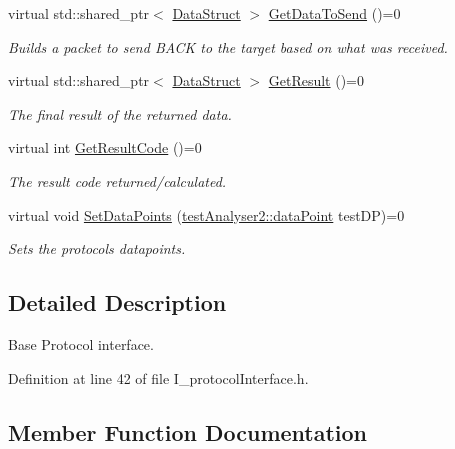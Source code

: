 \begin{DoxyCompactItemize}
virtual std\+::shared\+\_\+ptr$<$ \mbox{\hyperlink{structProtocol_1_1DataStruct}{Data\+Struct}} $>$ \mbox{\hyperlink{classProtocol_1_1I__protocolInterface_a28ae7afb66757d696858cd3a8f9bc21d}{Get\+Data\+To\+Send}} ()=0
\begin{DoxyCompactList}\small\item\em Builds a packet to send B\+A\+CK to the target based on what was received. \end{DoxyCompactList}\item 
virtual std\+::shared\+\_\+ptr$<$ \mbox{\hyperlink{structProtocol_1_1DataStruct}{Data\+Struct}} $>$ \mbox{\hyperlink{classProtocol_1_1I__protocolInterface_ac55c6c5aa39aa7340c4e74c0ad5ec04e}{Get\+Result}} ()=0
\begin{DoxyCompactList}\small\item\em The final result of the returned data. \end{DoxyCompactList}\item 
virtual int \mbox{\hyperlink{classProtocol_1_1I__protocolInterface_a3406495239b3685f089b62a3a34612bc}{Get\+Result\+Code}} ()=0
\begin{DoxyCompactList}\small\item\em The result code returned/calculated. \end{DoxyCompactList}\item 
virtual void \mbox{\hyperlink{classProtocol_1_1I__protocolInterface_a9c44ced4f589b5e694da148128fff938}{Set\+Data\+Points}} (\mbox{\hyperlink{structtestAnalyser2_1_1dataPoint}{test\+Analyser2\+::data\+Point}} test\+DP)=0
\begin{DoxyCompactList}\small\item\em Sets the protocols datapoints. \end{DoxyCompactList}\end{DoxyCompactItemize}


\subsection{Detailed Description}
Base Protocol interface. 

Definition at line 42 of file I\+\_\+protocol\+Interface.\+h.



\subsection{Member Function Documentation}
\mbox{\label{classProtocol_1_1I__protocolInterface_a49178196621b840100cb08cc86f3c122}} 
